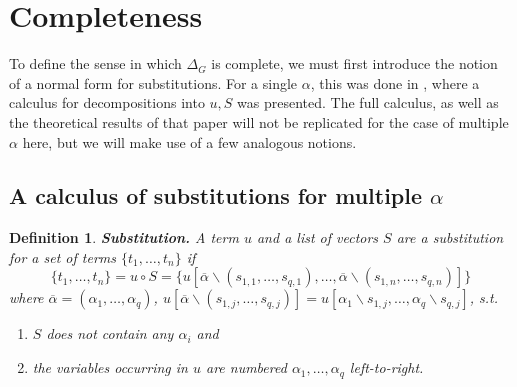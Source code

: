 \documentclass[a4paper, 11pt]{report}
\newtheorem{definition}{Definition}
\begin{document}
\section{Completeness}

To define the sense in which $\Delta_G$ is complete, we must first introduce the notion of a normal form for substitutions. For a single $\alpha$, this was done in \cite[Ch. 4]{Hetzl2012}, where a calculus for decompositions into $u,S$ was presented. The full calculus, as well as the theoretical results of that paper will not be replicated for the case of multiple $\alpha$ here, but we will make use of a few analogous notions.

\subsection{A calculus of substitutions for multiple $\alpha$}

\begin{definition}
  \textbf{Substitution.}
  A term $u$ and a list of vectors $S$ are a substitution for a set of terms $\{t_1,\dots,t_n\}$ if
  $$
    \{t_1,\dots,t_n\} =
    u \circ S =
    \{u[\overline{\alpha}\backslash(s_{1,1},\dots,s_{q,1}),\dots,\overline{\alpha}\backslash(s_{1,n},\dots,s_{q,n})]\}
  $$
  where $\overline{\alpha} = (\alpha_1,\dots,\alpha_q)$, $u[\overline{\alpha}\backslash(s_{1,j},\dots,s_{q,j})] = u[\alpha_1\backslash s_{1,j},\dots,\alpha_q\backslash s_{q,j}]$, s.t.
  \begin{enumerate}
    \item $S$ does not contain any $\alpha_i$ and
    \item the variables occurring in $u$ are numbered $\alpha_1,\dots,\alpha_q$ left-to-right.
  \end{enumerate}
\end{definition}
\end{document}
